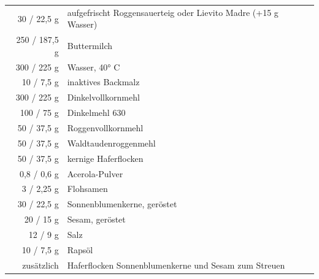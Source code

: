 \begin{tabular}{r l}
          30 / 22,5 g & aufgefrischt Roggensauerteig oder Lievito Madre (+15 g Wasser) \\
         250 / 187,5  g & Buttermilch                                                    \\
         300 / 225 g & Wasser, 40° C                                                  \\
          10 / 7,5 g & inaktives Backmalz                                             \\
         300 / 225 g & Dinkelvollkornmehl                                             \\
         100 / 75 g & Dinkelmehl  630                                                \\
          50 / 37,5 g & Roggenvollkornmehl                                             \\
          50 / 37,5 g & Waldtaudenroggenmehl                                           \\
          50 / 37,5 g & kernige Haferflocken                                           \\
         0,8 / 0,6 g & Acerola-Pulver                                                 \\
           3 / 2,25 g & Flohsamen                                                      \\
          30 / 22,5 g & Sonnenblumenkerne, geröstet                                    \\
          20 / 15 g & Sesam, geröstet                                                \\
          12 / 9 g & Salz                                                           \\
          10 / 7,5 g & Rapsöl                                                         \\
    zusätzlich & Haferflocken Sonnenblumenkerne und Sesam zum Streuen
\end{tabular}\\

